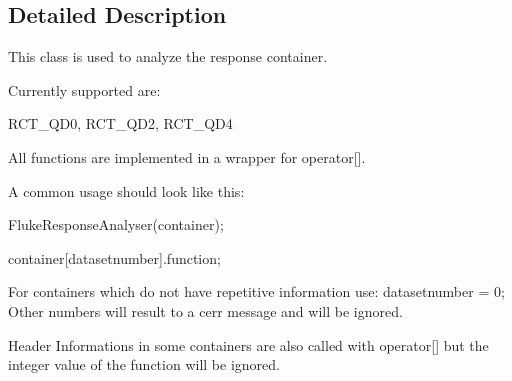 \subsection{Detailed Description}
This class is used to analyze the response container. \par
 Currently supported are: \par
 RCT\_\-QD0, RCT\_\-QD2, RCT\_\-QD4 \par
 All functions are implemented in a wrapper for operator\mbox{[}\mbox{]}.\par
 \par
 A common usage should look like this:\par
 FlukeResponseAnalyser(container); \par
 container\mbox{[}datasetnumber\mbox{]}.function;\par
 For containers which do not have repetitive information use: datasetnumber = 0; Other numbers will result to a cerr message and will be ignored.

Header Informations in some containers are also called with operator\mbox{[}\mbox{]} but the integer value of the function will be ignored. 

